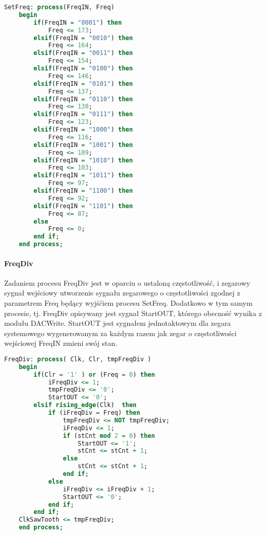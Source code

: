 \documentclass[11pt]{report}
\begin{document}
    
    \vspace{10mm} 
    \begin{lstlisting}[label=setfreq,caption=Proces SetFreq,frame=tb,language=vhdl]
    SetFreq: process(FreqIN, Freq)
    begin
        if(FreqIN = "0001") then 
        	Freq <= 173; 
        elsif(FreqIN = "0010") then
        	Freq <= 164; 
        elsif(FreqIN = "0011") then
        	Freq <= 154;
        elsif(FreqIN = "0100") then
        	Freq <= 146;
        elsif(FreqIN = "0101") then
        	Freq <= 137;
        elsif(FreqIN = "0110") then
        	Freq <= 130;
        elsif(FreqIN = "0111") then
        	Freq <= 123;
        elsif(FreqIN = "1000") then
        	Freq <= 116;
        elsif(FreqIN = "1001") then
        	Freq <= 109;
        elsif(FreqIN = "1010") then
        	Freq <= 103;
        elsif(FreqIN = "1011") then
        	Freq <= 97;
        elsif(FreqIN = "1100") then
        	Freq <= 92;
        elsif(FreqIN = "1101") then
        	Freq <= 87;
        else
        	Freq <= 0;
        end if;
    end process;
    \end{lstlisting}
    \newpage

	\paragraph{FreqDiv} 
	
    \par Zadaniem procesu FreqDiv jest w oparciu o ustaloną częstotliwość, i zegarowy sygnał wejściowy utworzenie sygnału zegarowego o częstotliwości zgodnej z parametrem Freq będący wyjśćiem procesu SetFreq. Dodatkowo w tym samym procesie, tj. FreqDiv opisywany jest sygnał StartOUT, którego obecność wynika z modułu DACWrite. StartOUT jest  sygnałem jednotaktowym dla zegara systemowego wygenerowanym za każdym razem jak zegar o częstotliwości wejściowej FreqIN zmieni swój stan.


    \vspace{20mm}         	
    \begin{lstlisting}[label=freqdiv,caption=Proces FreqDiv,frame=tb,language=vhdl]
    FreqDiv: process( Clk, Clr, tmpFreqDiv )
    begin
        if(Clr = '1' ) or (Freq = 0) then 
            iFreqDiv <= 1;
            tmpFreqDiv <= '0';
            StartOUT <= '0';
    	elsif rising_edge(Clk)  then
            if (iFreqDiv = Freq) then
                tmpFreqDiv <= NOT tmpFreqDiv;
                iFreqDiv <= 1;
                if (stCnt mod 2 = 0) then
                    StartOUT <= '1';
                    stCnt <= stCnt + 1;
                else
                    stCnt <= stCnt + 1;
                end if;
            else
                iFreqDiv <= iFreqDiv + 1;
                StartOUT <= '0';
            end if;
        end if;
    ClkSawTooth <= tmpFreqDiv;
    end process;
    \end{lstlisting}
    
\end{document}
